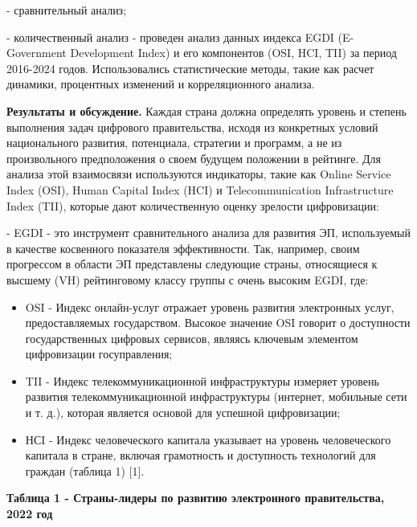 {- сравнительный анализ;

- количественный анализ - проведен анализ данных индекса EGDI
(E-Government Development Index) и его компонентов (OSI, HCI, TII) за
период 2016-2024 годов. Использовались статистические методы, такие как
расчет динамики, процентных изменений и корреляционного анализа.

{\bfseries Результаты и обсуждение.} Каждая страна должна определять
уровень и степень выполнения задач цифрового правительства, исходя из
конкретных условий национального развития, потенциала, стратегии и
программ, а не из произвольного предположения о своем будущем положении
в рейтинге. Для анализа этой взаимосвязи используются индикаторы, такие
как Online Service Index (OSI), Human Capital Index (HCI) и
Telecommunication Infrastructure Index (TII), которые дают
количественную оценку зрелости цифровизации:

- EGDI - это инструмент сравнительного анализа для развития ЭП,
используемый в качестве косвенного показателя эффективности. Так,
например, своим прогрессом в области ЭП представлены следующие страны,
относящиеся к высшему (VH) рейтинговому классу группы с очень высоким
EGDI, где:

\begin{itemize}
\item
  OSI - Индекс онлайн-услуг отражает уровень развития электронных услуг,
  предоставляемых государством. Высокое значение OSI говорит о
  доступности государственных цифровых сервисов, являясь ключевым
  элементом цифровизации госуправления;
\item
  TII - Индекс телекоммуникационной инфраструктуры измеряет уровень
  развития телекоммуникационной инфраструктуры (интернет, мобильные сети
  и т. д.), которая является основой для успешной цифровизации;
\item
  НСI - Индекс человеческого капитала указывает на уровень человеческого
  капитала в стране, включая грамотность и доступность технологий для
  граждан (таблица 1) {[}1{]}.
\end{itemize}

{\bfseries Таблица 1 - Страны-лидеры по развитию электронного
правительства, 2022 год}

}
